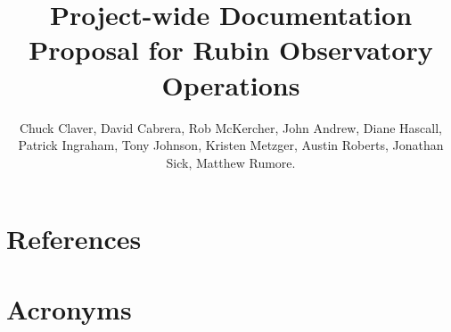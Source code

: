 \documentclass[SE,lsstdraft, authoryear,toc]{lsstdoc}
\title{Project-wide Documentation Proposal for Rubin Observatory Operations}
\author{%
Chuck Claver,
David Cabrera,
Rob McKercher,
John Andrew,
Diane Hascall,
Patrick Ingraham,
Tony Johnson,
Kristen Metzger,
Austin Roberts,
Jonathan Sick,
Matthew Rumore.
}
\date{\vcsDate}
\begin{document}
\maketitle









%






 
 





\newpage
\appendix



\newpage
\section{References} \label{sec:bib}
\renewcommand{\refname}{} %


\section{Acronyms} \label{sec:acronyms}

\end{document}
